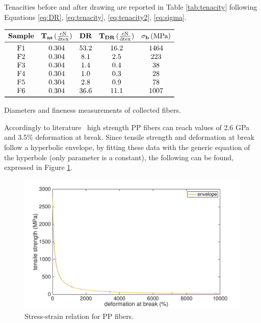 \documentclass[a4paper, 11pt]{article}
\begin{document}
Tenacities before and after drawing are reported in Table \ref{tab:tenacity} following Equations \ref{eq:DR}, \ref{eq:tenacity}, \ref{eq:tenacity2}, \ref{eq:sigma}.
\begin{table}[htp]
\centering
$
\begin{array}{ccccc}
\toprule
\textbf{Sample} & \mathbf{T_{as}} \, (\frac{\text{cN}}{\text{dtex}}) & \textbf{DR} & \mathbf{T_{DR}}\, (\frac{\text{cN}}{\text{dtex}}) & \mathbf{\sigma_b} \, (\text{MPa})\\
\midrule
\text{F1} & 0.304 & 53.2 & 16.2 & 1464\\
\text{F2} & 0.304 & 8.1 & 2.5 & 223\\ 
\text{F3} & 0.304 & 1.4 & 0.4 & 38\\
\text{F4} & 0.304 & 1.0 & 0.3 & 28\\
\text{F5} & 0.304 & 2.8 & 0.9 & 78\\
\text{F6} & 0.304 & 36.6 & 11.1 & 1007\\
\bottomrule
\end{array}
$
\caption{Diameters and fineness measurements of collected fibers.}
\label{tab:tenacity}
\end{table}

Accordingly to literature~\cite{handbook} high strength PP fibers can reach values of 2.6 GPa and 3.5\% deformation at break. Since tensile strength and deformation at break follow a hyperbolic envelope, by fitting these data with the generic equation of the hyperbole (only parameter is a constant), the following can be found, expressed in Figure \ref{fig:hyperbole}.
\begin{figure}[htp]
	\centering
	\includegraphics[scale=0.15]
	{hyperbole.png}
	\caption{Stress-strain relation for PP fibers.}
	\label{fig:hyperbole}
\end{figure}
\end{document}
